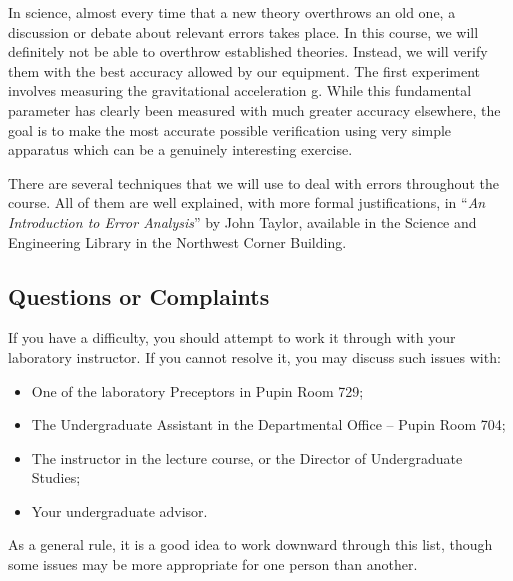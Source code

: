 In science, almost every time that a new theory overthrows an old one, a discussion or debate about relevant errors takes place. In this course, we will definitely not be able to overthrow established theories. Instead, we will verify them with the best accuracy allowed by our equipment. The first experiment involves measuring the gravitational acceleration g. While this fundamental parameter has clearly been measured with much greater accuracy elsewhere, the goal is to make the most accurate possible verification using very simple apparatus which can be a genuinely interesting exercise.\myskip

There are several techniques that we will use to deal with errors throughout the course. All of them are well explained, with more formal justifications, in ``\emph{An Introduction to Error Analysis}'' by John Taylor, available in the Science and Engineering Library in the Northwest Corner Building.

\subsection{Questions or Complaints}

If you have a difficulty, you should attempt to work it through with your laboratory instructor.  If you cannot resolve it, you may discuss such issues with:

\begin{itemize}
    \item One of the laboratory Preceptors in Pupin Room 729;

    \item The Undergraduate Assistant in the Departmental Office -- Pupin Room 704;

    \item The instructor in the lecture course, or the Director of Undergraduate Studies;

    \item Your undergraduate advisor.
\end{itemize}

As a general rule, it is a good idea to work downward through this list, though some issues may be more appropriate for one person than another.
